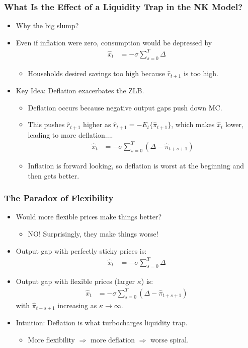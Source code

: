 \documentclass[english,xcolor=svgnames]{beamer}
\begin{document}
\begin{frame}
\frametitle{What Is the Effect of a Liquidity Trap in the NK Model?}
\begin{itemize}
	\item Why the big slump?
	\item Even if inflation were zero, consumption would be depressed by
	\begin{align*}
		\hat{x}_t &= -\sigma \sum_{s=0}^{T}\Delta  
	\end{align*}
	\begin{itemize}
		\item Households desired savings too high because $\hat{r}_{t+1}$ is too high.
	\end{itemize}
	\item Key Idea: Deflation exacerbates the ZLB.
	\begin{itemize}
		\item Deflation occurs because negative output gaps push down MC.
		\item This pushes $\hat{r}_{t+1}$ higher as $\hat{r}_{t+1} = -E_t\{\hat{\pi}_{t+1}\}$, which makes $\hat{x}_t$ lower, leading to more deflation....
		\begin{align*}
			\hat{x}_t &= -\sigma \sum_{s=0}^{T}(\Delta-\hat{\pi}_{t+s+1})	
		\end{align*}
		\item Inflation is forward looking, so deflation is worst at the beginning and then gets better.
	\end{itemize}
\end{itemize}
\end{frame}


\begin{frame}
\frametitle{The Paradox of Flexibility}
\begin{itemize}
	\item Would more flexible prices make things better?
	\begin{itemize}
		\item NO! Surprisingly, they make things worse!	
	\end{itemize}
	\item Output gap with perfectly sticky prices is:
	\begin{align*}
		\hat{x}_t &= -\sigma \sum_{s=0}^{T}\Delta  
	\end{align*}
	\item Output gap with flexible prices (larger $\kappa$) is:
	\begin{align*}
			\hat{x}_t &= -\sigma \sum_{s=0}^{T}(\Delta-\hat{\pi}_{t+s+1})	
		\end{align*}
		with $\hat{\pi}_{t+s+1}$ increasing as $\kappa\rightarrow\infty$.
	\item Intuition: Deflation is what turbocharges liquidity trap.
	\begin{itemize}
		\item More flexibility $\Rightarrow$ more deflation $\Rightarrow$ worse spiral.
	\end{itemize}
\end{itemize}	
\end{frame}
\end{document}
